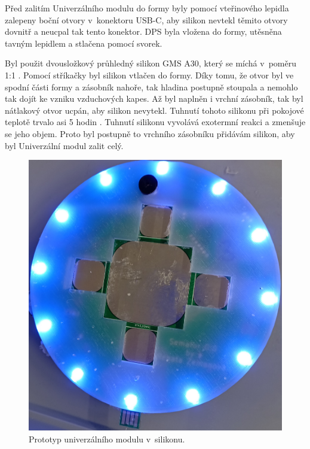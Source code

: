 Před zalitím Univerzálního modulu do formy byly pomocí vteřinového lepidla zalepeny boční otvory v~konektoru USB-C, aby silikon nevtekl těmito otvory dovnitř a neucpal tak tento konektor. DPS byla 
vložena do formy, utěsněna tavným lepidlem a stlačena pomocí svorek.

Byl použit dvousložkový průhledný silikon GMS A30, který se míchá v~poměru 1:1 \cite{silikon}. Pomocí stříkačky byl silikon vtlačen do formy. Díky tomu, že otvor byl ve spodní části formy a zásobník 
nahoře, tak hladina postupně stoupala a nemohlo tak dojít ke vzniku vzduchových kapes. Až byl naplněn i vrchní zásobník, tak byl nátlakový otvor ucpán, aby silikon nevytekl. Tuhnutí tohoto silikonu 
při pokojové teplotě trvalo asi 5 hodin \cite{silikon}. Tuhnutí silikonu vyvolává exotermní reakci a zmenšuje se jeho objem. Proto byl postupně to vrchního zásobníku přidávám silikon, aby byl 
Univerzální modul zalit celý. 

\begin{figure}[!h]
  \begin{center}
    \includegraphics[scale=0.12]{obrazky/DPS_prototyp_v_silikonu.jpg}
  \end{center}
  \caption[Prototyp univerzálního modulu v~silikonu]{Prototyp univerzálního modulu v~silikonu.}
\end{figure}

